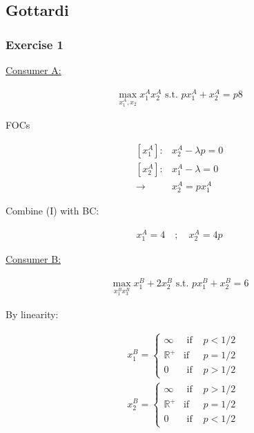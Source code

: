 {
\subsection*{Gottardi}

{
\subsubsection*{Exercise 1}

\begin{enumerate}[label=(\roman*)]
{\item 
\underline{Consumer A:}

\begin{align*}
\max _{x_1^A, x_2} x_1^A x_2^A \text { s.t. } p x_1^A+x_2^A=p 8
\end{align*}

FOCs

\begin{align*}
    {\left[x_1^A\right]:} & x_2^A-\lambda p=0 \\
    {\left[x_2^A\right]:} & x_1^A-\lambda=0 \\
    \rightarrow& x_2^A=p x_1^A\tag{I}
\end{align*}

Combine (I) with BC:

\begin{align*}
    x_1^A=4 \quad ; \quad x_2^A=4 p
\end{align*}

\underline{Consumer B:}

\begin{align*}
    \max _{x_{1}^{B} x_{3}^{B}} x_{1}^{B}+2 x_{2}^{B} \text{ s.t. }p x_{1}^{B}+x_{2}^{B}=6
\end{align*}

By linearity:

$$
\begin{aligned}
& x_{1}^{B}=\left\{\begin{array}{lll}
\infty & \text { if } & p<1 / 2 \\
\mathbb{R}^{+} & \text {if } & p=1 / 2 \\
0 & \text { if } & p>1 / 2
\end{array}\right. \\
& x_{2}^{B}=\left\{\begin{array}{lll}
\infty & \text { if } & p>1 / 2 \\
\mathbb{R}^{+} & \text {if } & p=1 / 2 \\
0 & \text { if } & p<1 / 2
\end{array}\right.
\end{aligned}
$$

}
\end{enumerate}}}
